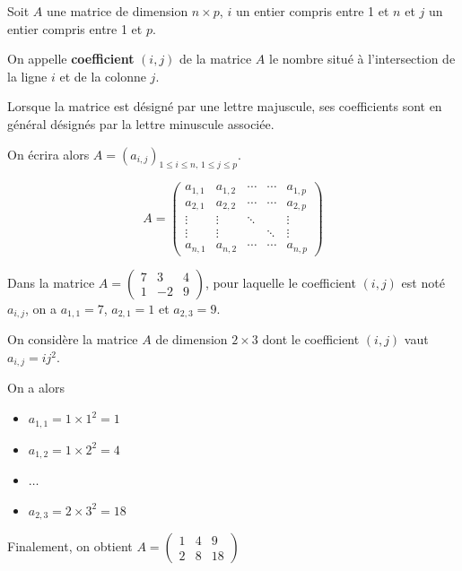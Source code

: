 \documentclass[11pt,fleqn]{book} %
\begin{document}
\begin{definition}Soit $A$ une matrice de dimension $n \times p$, $i$ un entier compris entre 1 et $n$ et $j$ un entier compris entre 1 et $p$. 

On appelle \textbf{coefficient} $(i,j)$ de la matrice $A$ le nombre situé à l'intersection de la ligne $i$ et de la colonne $j$. 

Lorsque la matrice est désigné par une lettre majuscule, ses coefficients sont en général désignés par la lettre minuscule associée. 

On écrira alors $A = (a_{i,j})_{ 1 \leqslant i \leqslant n ,\, 1 \leqslant j \leqslant p}$.

\[ A = \begin{pmatrix} a_{1,1} & a_{1,2} & \cdots & \cdots & a_{1,p} \\
a_{2,1} & a_{2,2} & \cdots & \cdots & a_{2,p} \\
\vdots & \vdots & \ddots & & \vdots \\
\vdots & \vdots & & \ddots & \vdots \\
a_{n,1} & a_{n,2} & \cdots & \cdots & a_{n,p} \end{pmatrix}\]\end{definition}

\begin{example}Dans la matrice $A=\begin{pmatrix} 7 & 3 & 4 \\ 1 & -2 & 9\end{pmatrix}$, pour laquelle le coefficient $(i,j)$ est noté $a_{i,j}$, on a $a_{1,1}=7$, $a_{2,1} = 1$ et $a_{2,3}=9$.\end{example}

\begin{example}On considère la matrice $A$ de dimension $2 \times 3$ dont le coefficient $(i,j)$ vaut $a_{i,j}=ij^2$. 

On a alors
\begin{itemize}
\item $a_{1,1}=1 \times 1^2 = 1$
\item $a_{1,2}=1 \times 2^2 = 4$
\item $\dots$
\item $a_{2,3}=2 \times  3^2=18$
\end{itemize}
Finalement, on obtient \(A=\begin{pmatrix}
1 & 4 & 9 \\
2 & 8 & 18
\end{pmatrix}\)\end{example}
\end{document}
